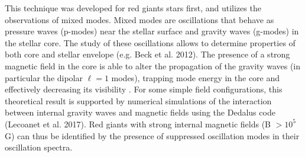 This technique was developed for red giants stars first, and utilizes the observations of mixed modes. Mixed modes are
oscillations that behave as pressure waves (p-modes) near the stellar surface and gravity waves (g-modes) in the stellar core.
The study of these oscillations allows to determine properties of both core and stellar envelope (e.g. Beck et al. 2012).
The presence of a strong magnetic field in the core is able to alter the propagation of the gravity waves (in particular the dipolar $\ell =1$ modes),
trapping mode energy in the core and effectively decreasing its visibility \citep{Fuller_2015}.
For some simple field configurations, this theoretical result is supported  by numerical simulations of the interaction between
internal gravity waves and magnetic fields using the Dedalus code (Lecoanet et al. 2017).
Red giants with strong internal magnetic fields (B $> 10^5$ G) can thus be identified by the presence of suppressed oscillation modes in their oscillation spectra.
